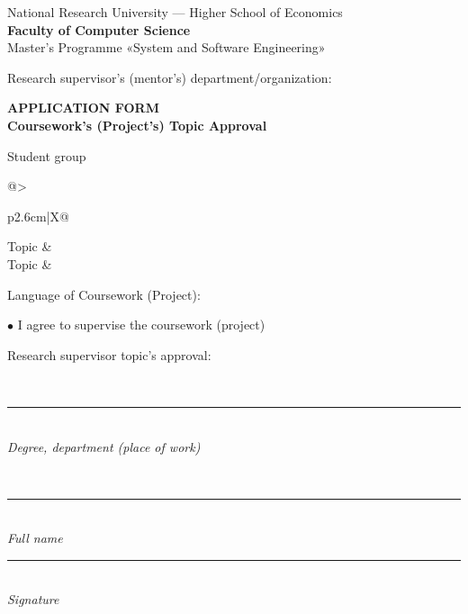 \documentclass[12pt,a4paper]{article}
\newcommand{\hseSignField}[2]{%
  \begin{minipage}[t]{#1}\centering
    \rule{\linewidth}{0.4pt}\\[-2pt]{\footnotesize\itshape #2}
  \end{minipage}}
\newcommand{\hseFilledField}[3]{%
  \begin{minipage}[t]{#1}\centering
    {\small\strut #2}\\[-4pt]\rule{\linewidth}{0.4pt}\\[-2pt]{\footnotesize\itshape #3}
  \end{minipage}}
\begin{document}
\clearpage
\begin{otherlanguage}{english}
\begin{center}
National Research University --- Higher School of Economics\\[4pt]
\textbf{Faculty of Computer Science}\\[4pt]
Master's Programme «System and Software Engineering»
\end{center}

\vspace{0.6cm}
\begin{minipage}[t]{0.5\textwidth}\raggedright
\small Research supervisor's (mentor's) department/organization:\\
\foreignlanguage{russian}{\hseSupervisorDepartment}
\end{minipage}

\vspace{0.6cm}
\begin{center}
\textbf{APPLICATION FORM}\\
\textbf{Coursework's (Project's) Topic Approval}
\end{center}

\vspace{0.4cm}
Student \underline{} group \underline{}

\vspace{0.6cm}
\begin{tabularx}{\textwidth}{@{}>{\raggedright\arraybackslash}p{2.6cm}|X@{}}
Topic & \foreignlanguage{russian}{\hseTitleRu} \\[0.6cm]
Topic & \hseTitleEn \\
\end{tabularx}

\vspace{0.6cm}
Language of Coursework (Project): \underline{\makebox[4cm][l]{\ \hseWorkLangEn}}

\vspace{0.5cm}
$\bullet$ I agree to supervise the coursework (project)

\vspace{0.3cm}
\begin{minipage}[t]{0.27\textwidth}\raggedright Research supervisor topic's approval:\end{minipage}%
\hseFilledField{0.3\textwidth}{\foreignlanguage{russian}{\hseSupervisorTitle\ifdefempty{\hseSupervisorDegree}{}{, \hseSupervisorDegree}}}{Degree, department (place of work)}\hfill
\hseFilledField{0.22\textwidth}{\foreignlanguage{russian}{\hseSupervisorName}}{Full name}\hfill
\hseSignField{0.15\textwidth}{Signature}


\end{otherlanguage}
\end{document}
